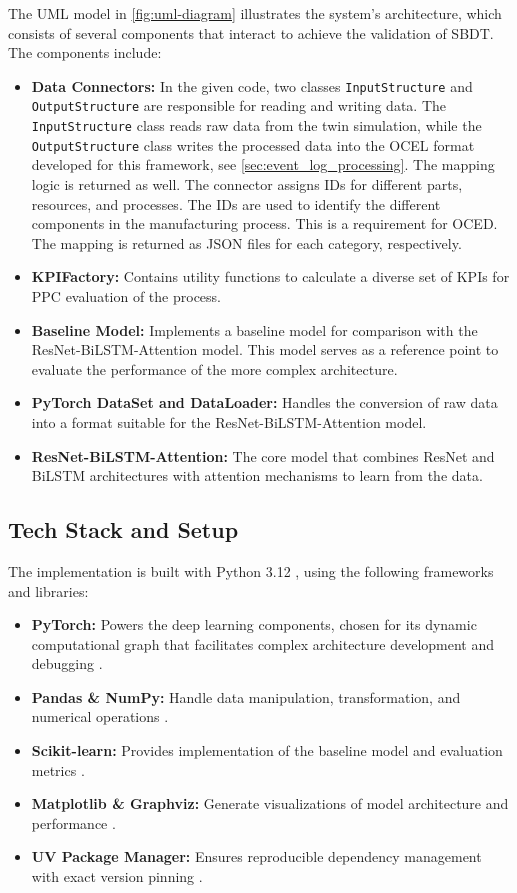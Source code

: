 The UML model \autocite{PlantUML} in \autoref{fig:uml-diagram} illustrates the system's architecture, which consists of several components that interact to achieve the validation of SBDT. The components include:
\begin{itemize}
  \item \textbf{Data Connectors:} In the given code, two classes \texttt{InputStructure} and \texttt{OutputStructure} are responsible for reading and writing data. The \texttt{InputStructure} class reads raw data from the twin simulation, while the \texttt{OutputStructure} class writes the processed data into the OCEL format developed for this framework, see \autoref{sec:event_log_processing}. The mapping logic is returned as well. The connector assigns IDs for different parts, resources, and processes. The IDs are used to identify the different components in the manufacturing process. This is a requirement for OCED. The mapping is returned as JSON files for each category, respectively.
  \item \textbf{KPIFactory:} Contains utility functions to calculate a diverse set of KPIs for PPC evaluation of the process.
  \item \textbf{Baseline Model:} Implements a baseline model for comparison with the ResNet-BiLSTM-Attention model. This model serves as a reference point to evaluate the performance of the more complex architecture.
  \item \textbf{PyTorch DataSet and DataLoader:} Handles the conversion of raw data into a format suitable for the ResNet-BiLSTM-Attention model.
  \item \textbf{ResNet-BiLSTM-Attention:} The core model that combines ResNet and BiLSTM architectures with attention mechanisms to learn from the data.
\end{itemize}

\subsection{Tech Stack and Setup}
The implementation is built with Python 3.12 \autocite{Python}, using the following frameworks and libraries:

\begin{itemize}
  \item \textbf{PyTorch:} Powers the deep learning components, chosen for its dynamic computational graph that facilitates complex architecture development and debugging \autocite{PyTorch}.
  \item \textbf{Pandas \& NumPy:} Handle data manipulation, transformation, and numerical operations \autocite{NumPy, Pandas}.
  \item \textbf{Scikit-learn:} Provides implementation of the baseline model and evaluation metrics \autocite{ScikitLearn}.
  \item \textbf{Matplotlib \& Graphviz:} Generate visualizations of model architecture and performance \autocite{Matplotlib, Graphviz}.
  \item \textbf{UV Package Manager:} Ensures reproducible dependency management with exact version pinning \autocite{UV}.
\end{itemize}

